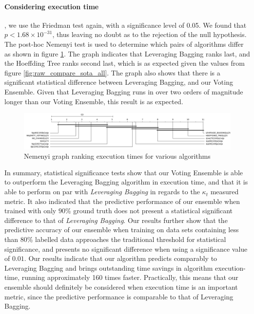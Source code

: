 \documentclass[runningheads]{llncs}
\begin{document}
\paragraph{Considering execution time}, we use the Friedman test again, with a significance level of 0.05. We found that $p < 1.68\times10^{-31}$, thus leaving no doubt as to the rejection of the null hypothesis. The post-hoc Nemenyi test is used to determine which pairs of algorithms differ as shown in figure  \ref{fig:sota_compare_all_execution_time_nemenyi}. The graph indicates that Leveraging Bagging ranks last, and the Hoeffding Tree ranks second last, which is as expected given the  values from figure \ref{fig:raw_compare_sota_all}.
The graph also shows that there is a significant statistical difference between Leveraging Bagging, and our Voting Ensemble. Given that Leveraging Bagging runs in over two orders of magnitude longer than our Voting Ensemble, this result is as expected. 

\begin{figure}
  \includegraphics[width=\linewidth]{./images/chapter5/sota_compare_all_execution_time_nemenyi}
\caption{\label{fig:sota_compare_all_execution_time_nemenyi}Nemenyi graph ranking execution times for various algorithms}
\end{figure}



In summary, 
statistical significance tests show that our Voting Ensemble is able to outperform the Leveraging Bagging algorithm in execution time, and that it is able to perform on par with \textit{Leveraging Bagging} in regards to the $\kappa_t$ measured metric. It also indicated that the predictive performance of our ensemble when trained with only $90\%$ ground truth does not present a statistical significant difference to that of \textit{Leveraging Bagging}. Our results further show that the predictive accuracy of our ensemble when training on data sets containing less than 80\% labelled data approaches the traditional threshold for statistical significance, and presents no significant difference when using a significance value of $0.01$.
Our results indicate that our algorithm  predicts comparably to Leveraging Bagging and brings outstanding time savings in algorithm execution-time, running approximately 160 times faster. Practically, this means that our ensemble should definitely be considered when execution time is an important metric, since the predictive performance is comparable to that of Leveraging Bagging.
\end{document}
